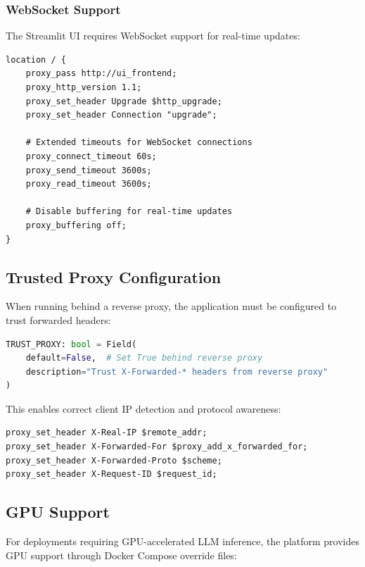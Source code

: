 \subsubsection{WebSocket Support}

The Streamlit UI requires WebSocket support for real-time updates:

\begin{lstlisting}[language=nginx, caption=WebSocket configuration for Streamlit]
location / {
    proxy_pass http://ui_frontend;
    proxy_http_version 1.1;
    proxy_set_header Upgrade $http_upgrade;
    proxy_set_header Connection "upgrade";
    
    # Extended timeouts for WebSocket connections
    proxy_connect_timeout 60s;
    proxy_send_timeout 3600s;
    proxy_read_timeout 3600s;
    
    # Disable buffering for real-time updates
    proxy_buffering off;
}
\end{lstlisting}

\subsection{Trusted Proxy Configuration}

When running behind a reverse proxy, the application must be configured to trust forwarded headers:

\begin{lstlisting}[language=Python, caption=Trusted proxy settings]
TRUST_PROXY: bool = Field(
    default=False,  # Set True behind reverse proxy
    description="Trust X-Forwarded-* headers from reverse proxy"
)
\end{lstlisting}

This enables correct client IP detection and protocol awareness:

\begin{lstlisting}[language=nginx, caption=Forwarded headers in NGINX]
proxy_set_header X-Real-IP $remote_addr;
proxy_set_header X-Forwarded-For $proxy_add_x_forwarded_for;
proxy_set_header X-Forwarded-Proto $scheme;
proxy_set_header X-Request-ID $request_id;
\end{lstlisting}

\subsection{GPU Support}

For deployments requiring GPU-accelerated LLM inference, the platform provides GPU support through Docker Compose override files:

